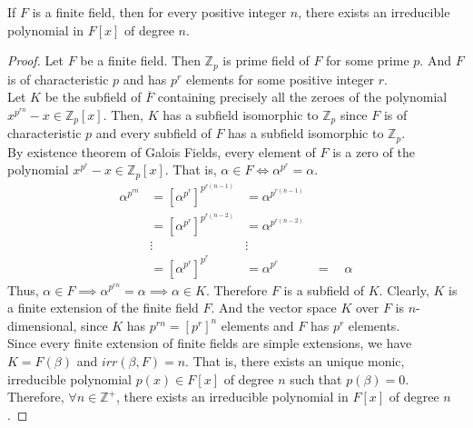 \begin{corollary}
	If $F$ is a finite field, then for every positive integer $n$, there exists an irreducible polynomial in $F[x]$ of degree $n$.
\end{corollary}
\begin{proof}
	Let $F$ be a finite field. Then $\mathbb{Z}_p$ is prime field of $F$ for some prime $p$. And $F$ is of characteristic $p$ and has $p^r$ elements for some positive integer $r$.\\ %

	Let $K$ be the subfield of $\overline{F}$ containing precisely all the zeroes of the polynomial $x^{p^{rn}}-x \in \mathbb{Z}_p[x]$. Then, $K$ has a subfield isomorphic to $\mathbb{Z}_p$ since $F$ is of characteristic $p$ and every subfield of $F$ has a subfield isomorphic to $\mathbb{Z}_p$.\\

	By existence theorem of Galois Fields, every element of $F$ is a zero of the polynomial $x^{p^r}-x \in \mathbb{Z}_p[x]$. That is, $\alpha \in F \iff \alpha^{p^r} = \alpha$.
	\begin{align*}
		\alpha^{p^{rn}} & = \left[\alpha^{p^r}\right]^{p^{r(n-1)}} & =  \alpha^{p^{r(n-1)}} & \\
		& = \left[\alpha^{p^r}\right]^{p^{r(n-2)}} & =  \alpha^{p^{r(n-2)}} & \\
		& \vdots & \vdots & \\
		& = \left[\alpha^{p^r}\right]^{p^r} & = \alpha^{p^r} & = \quad \alpha
	\end{align*}
	Thus, $\alpha \in F \implies \alpha^{p^{rn}} = \alpha \implies \alpha \in K$. Therefore $F$ is a subfield of $K$. Clearly, $K$ is a finite extension of the finite field $F$. And the vector space $K$ over $F$ is $n$-dimensional, since $K$ has $p^{rn} = [p^r]^n$ elements and $F$ has $p^r$ elements.\\
	
	Since every finite extension of finite fields are simple extensions, we have $K = F(\beta)$ and $irr(\beta,F) = n$. That is, there exists an unique monic, irreducible polynomial $p(x) \in F[x]$ of degree $n$ such that $p(\beta) = 0$. Therefore, $\forall n \in \mathbb{Z}^+$, there exists an irreducible polynomial in $F[x]$ of degree $n$.
\end{proof}



